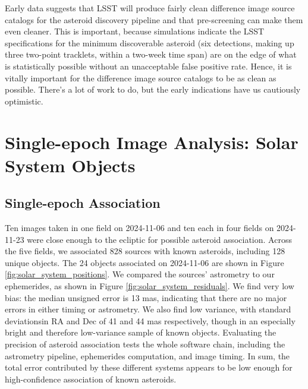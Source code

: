 Early data suggests that LSST will produce fairly clean difference image source catalogs for the asteroid discovery pipeline and that pre-screening can make them even cleaner. This is important, because simulations indicate the LSST specifications for the minimum discoverable asteroid (six detections, making up three two-point tracklets, within a two-week time span) are on the edge of what is statistically possible without an unacceptable false positive rate. Hence, it is vitally important for the difference image source catalogs to be as clean as possible. There's a lot of work to do, but the early indications have us cautiously optimistic.

\section{Single-epoch Image Analysis: Solar System Objects}
\label{sec:sia_solar_system}

\subsection{Single-epoch Association}
\label{sec:association}



Ten images taken in one field on 2024-11-06 and ten each in four fields on 2024-11-23 were close enough to the ecliptic for possible asteroid association. Across the five fields, we associated 828 sources with known asteroids, including 128 unique objects. The 24 objects associated on 2024-11-06 are shown in Figure \ref{fig:solar_system_positions}. We compared the sources' astrometry to our ephemerides, as shown in Figure \ref{fig:solar_system_residuals}. We find very low bias: the median unsigned error is 13 mas, indicating that there are no major errors in either timing or astrometry. We also find low variance, with standard deviationsin RA and Dec of 41 and 44 mas respectively, though in an especially bright and therefore low-variance sample of known objects. Evaluating the precision of asteroid association tests the whole software chain, including the astrometry pipeline, ephemerides computation, and image timing. In sum, the total error contributed by these different systems appears to be low enough for high-confidence association of known asteroids.

